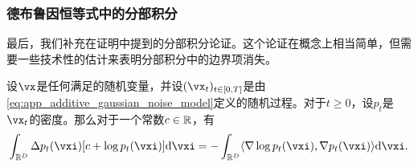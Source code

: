 \documentclass[../../book-main_zh.tex]{subfiles}
\begin{document}
\subsubsection{德布鲁因恒等式中的分部积分}

最后，我们补充在证明中提到的分部积分论证。这个论证在概念上相当简单，但需要一些技术性的估计来表明分部积分中的边界项消失。

\begin{lemma}\label{lem:diffusion_ibp}
    设\(\vx\)是任何满足的随机变量，并设\((\vx_{t})_{t \in [0, T]}\)是由\eqref{eq:app_additive_gaussian_noise_model}定义的随机过程。对于\(t \geq 0\)，设\(p_{t}\)是\(\vx_{t}\)的密度。那么对于一个常数\(c \in \mathbb{R}\)，有
    \begin{equation}
        \int_{\R^{D}}\Delta p_{t}(\vxi)[c + \log p_{t}(\vxi)]\odif{\vxi} = -\int_{\R^{D}}\ip{\nabla \log p_{t}(\vxi)}{\nabla p_{t}(\vxi)}\odif{\vxi}.
    \end{equation}
\end{lemma}
\end{document}
